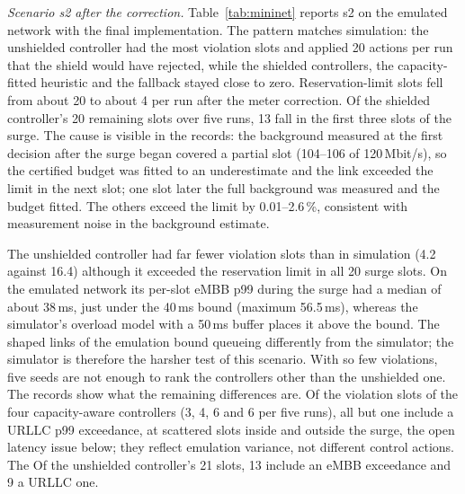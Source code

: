 \emph{Scenario s2 after the correction.} Table~\ref{tab:mininet} reports s2 on the
emulated network with the final implementation. The pattern matches simulation:
the unshielded controller had the most violation slots and applied 20 actions per
run that the shield would have rejected, while the shielded controllers, the
capacity-fitted heuristic and the fallback stayed close to zero. Reservation-limit
slots fell from about 20 to about 4 per run after the meter correction. Of the
shielded controller's 20 remaining slots over five runs, 13 fall in the first three
slots of the surge. The cause is visible in the records: the background measured at
the first decision after the surge began covered a partial slot (104--106 of
120\,Mbit/s), so the certified budget was fitted to an underestimate and the link
exceeded the limit in the next slot; one slot later the full background was measured
and the budget fitted. The others exceed the limit by 0.01--2.6\,\%, consistent with
measurement noise in the background estimate.

The unshielded controller had far fewer violation slots than in simulation (4.2
against 16.4) although it exceeded the reservation limit in all 20 surge slots. On
the emulated network its per-slot eMBB p99 during the surge had a median of about
38\,ms, just under the 40\,ms bound (maximum 56.5\,ms), whereas the simulator's
overload model with a 50\,ms buffer places it above the bound. The shaped links of
the emulation bound queueing differently from the simulator; the simulator is
therefore the harsher test of this scenario. With so few violations,
five seeds are not enough to rank the controllers other than the unshielded one.
The records show what the remaining differences are. Of the violation slots of the
four capacity-aware controllers (3, 4, 6 and 6 per five runs), all but one include a
URLLC p99 exceedance, at scattered slots inside and outside the surge, the open latency
issue below; they reflect emulation variance, not different control actions. The
Of the unshielded controller's 21 slots, 13 include an eMBB exceedance and 9 a URLLC one.

